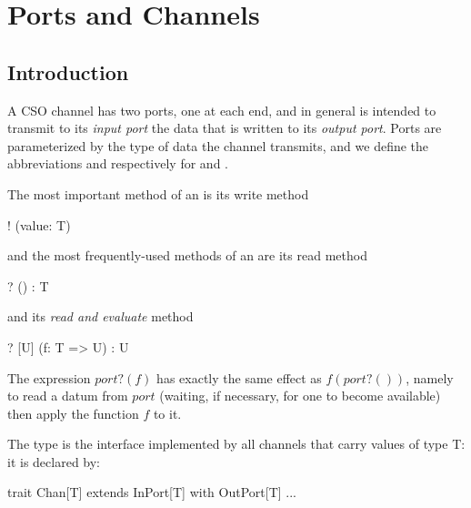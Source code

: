 \documentclass[12pt]{IOS-Book-Article-CPA-2017}
\begin{document}
\begin{comment}
\subsection{Starting and running background processes}
It can sometimes simplify the construction of a large system to
have processes that run (more or less permanently) in the background.
%
If $p$ is a process, then evaluation of the expression $p~$\textscala{fork}
starts $p$ in a new thread that runs concurrently with
the current thread. The value of the expression is a  \textscala{process.Handle}
associated with the newly started thread and can be used to discover when
(and how) the thread terminates. 
\end{comment}

\section{Ports and Channels}

\subsection{Introduction}
A CSO channel has two ports, one at each end, and in general is intended to transmit
to its \textit{input port} the data that is written to its \textit{output port}. Ports
are parameterized by the type of data the channel transmits, and we define the abbreviations
 and \textscala{![T]} respectively for
 and .

The most important method of 
an \textscala{![T]} is its write method
\begin{code}[]
    ! (value: T) 
\end{code}
and the most frequently-used methods of
an  are its read method
\begin{code}[]
    ? () : T
\end{code}
and its \textit{read and evaluate} method 
\begin{code}[]
    ? [U] (f: T => U) : U 
\end{code}
The expression $port?(f)$ has exactly the same
effect as $f(port?())$, namely to read a datum from $port$ 
(waiting, if necessary, for one to become available) then apply 
the function $f$ to it.

The type  is the interface implemented by all
channels that carry values of type \textsc{T}: it is declared by:
\begin{code}[]
    trait  Chan[T] extends InPort[T] with OutPort[T] { ... }
\end{code}
\end{document}
